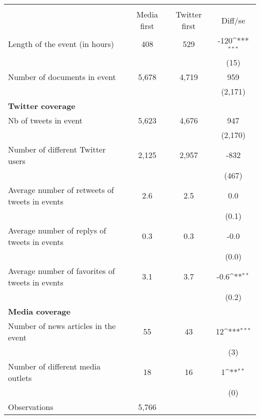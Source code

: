 {
\def\sym#1{\ifmmode^{#1}\else\(^{#1}\)\fi}
\begin{tabular}{l*{1}{ccc}}
\hline\hline
                    &\multicolumn{3}{c}{ }                          \\
                    & Media first&Twitter first&     Diff/se         \\
\hline
Length of the event (in hours)&         408&         529&        -120\sym{***}\\
                    &            &            &        (15)         \\
Number of documents in event&       5,678&       4,719&         959         \\
                    &            &            &     (2,171)         \\
\textbf{Twitter coverage}&            &            &                     \\
Nb of tweets in event&       5,623&       4,676&         947         \\
                    &            &            &     (2,170)         \\
Number of different Twitter users&       2,125&       2,957&        -832         \\
                    &            &            &       (467)         \\
Average number of retweets of tweets in events&         2.6&         2.5&         0.0         \\
                    &            &            &       (0.1)         \\
Average number of replys of tweets in events&         0.3&         0.3&        -0.0         \\
                    &            &            &       (0.0)         \\
Average number of favorites of tweets in events&         3.1&         3.7&        -0.6\sym{**} \\
                    &            &            &       (0.2)         \\
\textbf{Media coverage}&            &            &                     \\
Number of news articles in the event&          55&          43&          12\sym{***}\\
                    &            &            &         (3)         \\
Number of different media outlets&          18&          16&           1\sym{**} \\
                    &            &            &         (0)         \\
\hline
Observations        &       5,766&            &                     \\
\hline\hline
\end{tabular}
}

